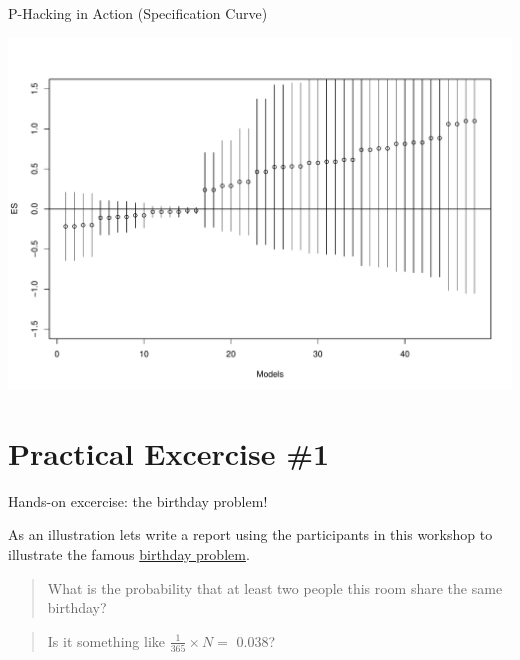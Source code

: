 \documentclass[ignorenonframetext,]{beamer}
\begin{document}
\begin{frame}{P-Hacking in Action (Specification Curve)}
\protect\hypertarget{p-hacking-in-action-specification-curve}{}

\includegraphics{slides_w_beamer_files/figure-beamer/spec curve-1.pdf}

\end{frame}

\hypertarget{practical-excercise-1}{%
\section{Practical Excercise \#1}\label{practical-excercise-1}}

\begin{frame}{Hands-on excercise: the birthday problem!}
\protect\hypertarget{hands-on-excercise-the-birthday-problem}{}

As an illustration lets write a report using the participants in this
workshop to illustrate the famous
\href{https://en.wikipedia.org/wiki/Birthday_problem}{birthday problem}.

\begin{quote}
What is the probability that at least two people this room share the
same birthday?
\end{quote}

\begin{quote}
Is it something like \(\frac{1}{365} \times N =\) 0.038?
\end{quote}

\end{frame}
\end{document}
